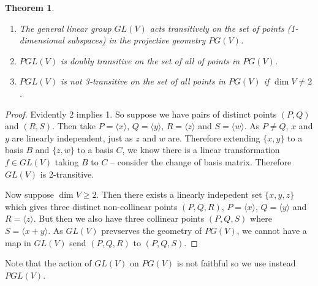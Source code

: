 \documentclass[12pt]{article}
\newtheorem{thm}{Theorem}
\begin{document}
\begin{thm}
\begin{enumerate}
\item The general linear group $GL(V)$ acts transitively on the set of points (1-dimensional subspaces) in the
projective geometry $PG(V)$.
\item $PGL(V)$ is doubly transitive on the set of all of points in $PG(V)$.
\item $PGL(V)$ is not 3-transitive on the set of all points in $PG(V)$ if $\dim V\neq 2$.
\end{enumerate}
\end{thm}
\begin{proof}
Evidently 2 implies 1.  So suppose we have pairs of distinct points $(P,Q)$ and $(R,S)$.  Then take
$P=\langle x\rangle$, $Q=\langle y\rangle$, $R=\langle z\rangle$ and $S=\langle w\rangle$.
As $P\neq Q$, $x$ and $y$ are linearly independent, just as $z$ and $w$ are.  Therefore extending
$\{x,y\}$ to a basis $B$ and $\{z,w\}$ to a basis $C$, we know there is a linear transformation
$f\in GL(V)$ taking $B$ to $C$ -- consider the change of basis matrix.  Therefore $GL(V)$ is 
2-transitive.

Now suppose $\dim V\geq 2$.  Then there exists a linearly indepedent set $\{x,y,z\}$ which 
gives three distinct non-collinear points $(P,Q,R)$, $P=\langle x\rangle$, $Q=\langle y\rangle$ 
and $R=\langle z\rangle$.   But then we also have three collinear points
$(P,Q,S)$ where $S=\langle x+y\rangle$.  As $GL(V)$ prevserves the geometry of $PG(V)$,
we cannot have a map in $GL(V)$ send $(P,Q,R)$ to $(P,Q,S)$.
\end{proof}

Note that the action of $GL(V)$ on $PG(V)$ is not faithful so we use instead $PGL(V)$.
\end{document}
